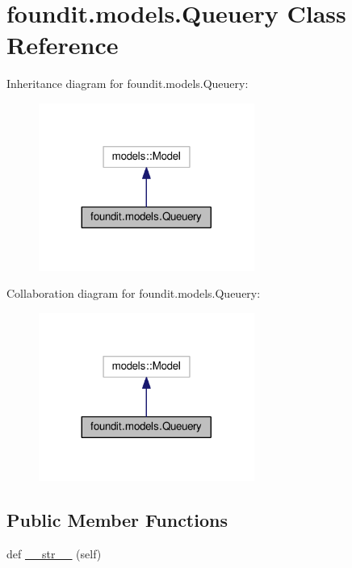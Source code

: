 \hypertarget{classfoundit_1_1models_1_1_queuery}{}\section{foundit.\+models.\+Queuery Class Reference}
\label{classfoundit_1_1models_1_1_queuery}


Inheritance diagram for foundit.\+models.\+Queuery\+:\nopagebreak
\begin{figure}[H]
\begin{center}
\leavevmode
\includegraphics[width=200pt]{classfoundit_1_1models_1_1_queuery__inherit__graph}
\end{center}
\end{figure}


Collaboration diagram for foundit.\+models.\+Queuery\+:\nopagebreak
\begin{figure}[H]
\begin{center}
\leavevmode
\includegraphics[width=200pt]{classfoundit_1_1models_1_1_queuery__coll__graph}
\end{center}
\end{figure}
\subsection*{Public Member Functions}
\begin{DoxyCompactItemize}
\item 
def \hyperlink{classfoundit_1_1models_1_1_queuery_a519b4c4c91400a99a5c09e89372a923c}{\+\_\+\+\_\+str\+\_\+\+\_\+} (self)
\end{DoxyCompactItemize}
